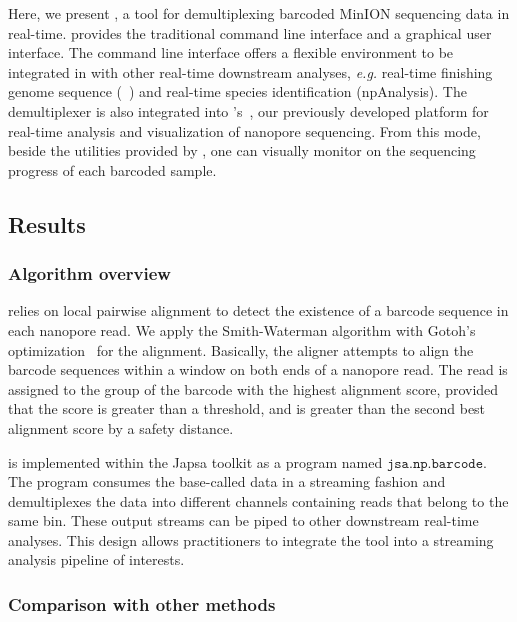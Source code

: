 Here, we present \npbarcode{}, a tool for demultiplexing barcoded MinION sequencing data in real-time. \npbarcode{} provides the traditional command line interface and a graphical user interface.
The command line interface offers a flexible environment to be integrated in with other real-time downstream analyses, \emph{e.g.} real-time finishing genome sequence (\npscarf{}~\cite{Cao2017scaffolding}) and real-time 
species identification (npAnalysis\cite{CaoGE2016}). The demultiplexer is also integrated into \npreader{}'s~\cite{CaoGC2016}, our previously developed platform for real-time analysis and visualization of nanopore sequencing.
From this mode, beside the utilities provided by \npreader{}, one can visually monitor on the sequencing progress of each barcoded sample.

\subsection{Results}
\subsubsection{Algorithm overview}
\npbarcode{} relies on local pairwise alignment to detect the existence of a barcode sequence in each nanopore read. We apply the Smith-Waterman algorithm with Gotoh's optimization~\cite{Gotoh1982improved} for the alignment. Basically, 
the aligner attempts to align the barcode sequences within a window on both ends of a nanopore read. The read is assigned to the group of the barcode with the highest alignment score, provided that the score is greater than a threshold, and is greater than the second best alignment score by a safety distance.

\npbarcode{} is implemented within the Japsa toolkit as a program named $\mathtt{jsa.np.barcode}$.
The program consumes the base-called data in a streaming fashion and demultiplexes the data into different channels containing reads that belong to the same bin. 
These output streams can be piped to other downstream real-time analyses.
This design allows practitioners to integrate the tool into a streaming analysis pipeline of interests.

\subsubsection{Comparison with other methods}

